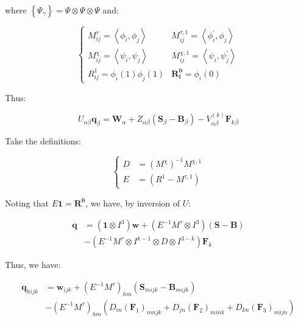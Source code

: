 \documentclass[twoside,english,final,5p,times,twocolumn]{elsarticle}
\begin{document}
where $\left\{ \Psi_{\gamma}\right\} =\Psi\otimes\Psi\otimes\Psi$
and:

\begin{equation}
\begin{cases}
M_{ij}^{\tau}=\left\langle \phi_{i},\phi_{j}\right\rangle  & M_{ij}^{\tau,1}=\left\langle \phi_{i}^{'},\phi_{j}\right\rangle \\
M_{ij}^{\chi}=\left\langle \psi_{i},\psi_{j}\right\rangle  & M_{ij}^{\chi,1}=\left\langle \psi_{i},\psi_{j}^{'}\right\rangle \\
R_{ij}^{1}=\phi_{i}\left(1\right)\phi_{j}\left(1\right) & \boldsymbol{R_{i}^{0}}=\phi_{i}\left(0\right)
\end{cases}\label{eq:inner product matrices}
\end{equation}

Thus:

\begin{equation}
U_{\alpha\beta}\boldsymbol{q}_{\beta}=\boldsymbol{W}_{\alpha}+Z_{\alpha\beta}\left(\boldsymbol{S}_{\beta}-\boldsymbol{B}_{\beta}\right)-V_{\alpha\beta}^{\left(k\right)}\boldsymbol{F}_{k}{}_{\beta}\label{eq:DGit}
\end{equation}

Take the definitions:

\begin{equation}
\begin{cases}
D & =\left(M^{\chi}\right)^{-1}M^{\chi,1}\\
E & =\left(R^{1}-M^{\tau,1}\right)
\end{cases}\label{eq:compound matrices}
\end{equation}

Noting that $E\boldsymbol{1}=\boldsymbol{R^{0}}$, we have, by inversion
of $U$:

\begin{align}
\boldsymbol{q} & =\left(\boldsymbol{1}\otimes I^{3}\right)\boldsymbol{w}+\left(E^{-1}M^{\tau}\otimes I^{3}\right)\left(\boldsymbol{S}-\boldsymbol{B}\right)\\
 & -\left(E^{-1}M^{\tau}\otimes I^{k-1}\otimes D\otimes I^{3-k}\right)\boldsymbol{F}_{k}\nonumber 
\end{align}

Thus, we have:

\begin{align}
\boldsymbol{q}_{hijk} & =\boldsymbol{w}_{ijk}+\left(E^{-1}M^{\tau}\right)_{hm}\left(\boldsymbol{S}_{mijk}-\boldsymbol{B}_{mijk}\right)\label{eq:q system}\\
 & -\left(E^{-1}M^{\tau}\right)_{hm}\left(D_{in}\left(\boldsymbol{F}_{1}\right)_{mnjk}+D_{jn}\left(\boldsymbol{F}_{2}\right)_{mink}+D_{kn}\left(\boldsymbol{F}_{3}\right)_{mijn}\right)\nonumber 
\end{align}
\end{document}
